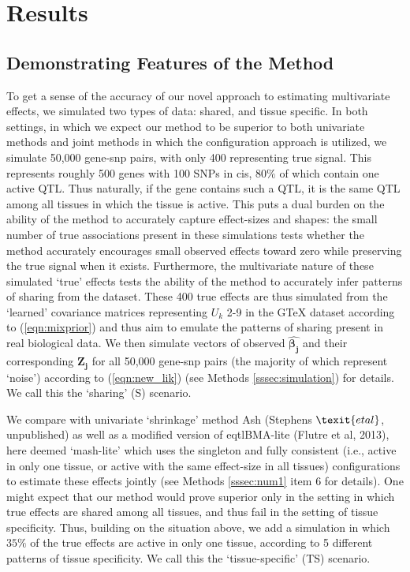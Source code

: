 
\section{Results}
\subsection{Demonstrating Features of the Method}

To get a sense of the accuracy of our novel approach to estimating multivariate effects, we simulated two types of data: shared, and tissue specific. In both settings, in which we expect our method to be superior to both univariate methods and joint methods in which the configuration approach is utilized, we simulate 50,000 gene-snp pairs, with only 400 representing true signal. This represents roughly 500 genes with 100 SNPs in cis, $80\%$ of which contain one active QTL. Thus naturally, if the gene contains such a QTL, it is the same QTL among all tissues in which the tissue is active. This puts a dual burden on the ability of the method to accurately capture effect-sizes and shapes: the small number of true associations present in these simulations tests whether the method accurately encourages small observed effects toward zero while preserving the true signal when it exists. Furthermore, the  multivariate nature of these simulated `true' effects tests the ability of the method to accurately infer patterns of sharing from the dataset. These 400 true effects are thus simulated from the `learned' covariance matrices representing $U_{k}$ 2-9 in the GTeX dataset according to (\ref{eqn:mixprior}) and thus aim to emulate the patterns of sharing present in real biological data. We then simulate vectors of observed $\bm{\hat{\beta_{j}}}$ and their corresponding $\bm{Z_{j}}$ for all 50,000 gene-snp pairs (the majority of which represent `noise') according to (\ref{eqn:new_lik}) (see Methods \ref{sssec:simulation}) for details. %
 We call this the `sharing' (S) scenario. 

 We compare with univariate `shrinkage' method Ash (Stephens $\texit{et al}$, unpublished) as well as a modified version of eqtlBMA-lite (Flutre et al, 2013), here deemed `mash-lite' which uses the singleton and fully consistent (i.e., active in only one tissue, or active with the same effect-size in all tissues) configurations to estimate these effects jointly (see Methods \ref{sssec:num1} item 6 for details).  
 One might expect that our method would prove superior only in the setting in which true effects are shared among all tissues, and thus fail in the setting of tissue specificity. Thus, building on the situation above, we add a simulation in which $35\%$ of the true effects are active in only one tissue, according to 5 different patterns of tissue specificity. We call this the `tissue-specific' (TS) scenario. 

